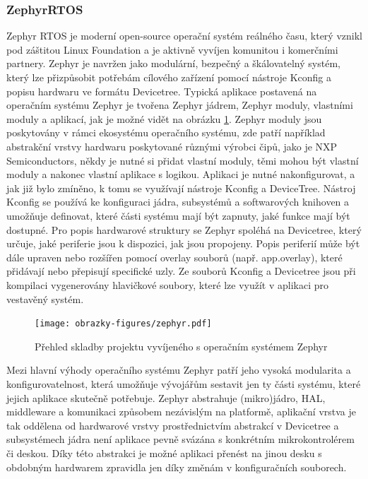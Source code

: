 \subsubsection{ZephyrRTOS}
\label{zephyr_rtos}
Zephyr RTOS je moderní open-source operační systém reálného času, který vznikl pod záštitou Linux Foundation a je aktivně vyvíjen komunitou i komerčními partnery. Zephyr je navržen jako modulární, bezpečný a škálovatelný systém, který lze přizpůsobit potřebám cílového zařízení pomocí nástroje Kconfig a popisu hardwaru ve formátu Devicetree. Typická aplikace postavená na operačním systému Zephyr je tvořena Zephyr jádrem, Zephyr moduly, vlastními moduly a aplikací, jak je možné vidět na obrázku \ref{fig:zephyr}. Zephyr moduly jsou poskytovány v rámci ekosystému operačního systému, zde patří například abstrakční vrstvy hardwaru poskytované různými výrobci čipů, jako je NXP Semiconductors, někdy je nutné si přidat vlastní moduly, těmi mohou být vlastní moduly a nakonec vlastní aplikace s logikou. Aplikaci je nutné nakonfigurovat, a jak již bylo zmíněno, k tomu se využívají nástroje Kconfig a DeviceTree. Nástroj Kconfig se používá ke konfiguraci jádra, subsystémů a softwarových knihoven a umožňuje  definovat, které části systému mají být zapnuty, jaké funkce mají být dostupné. Pro popis hardwarové struktury se Zephyr spoléhá na Devicetree, který určuje, jaké periferie jsou k dispozici, jak jsou propojeny. Popis periferií může být dále upraven nebo rozšířen pomocí overlay souborů (např. app.overlay), které přidávají nebo přepisují specifické uzly. Ze souborů Kconfig a Devicetree jsou při kompilaci vygenerovány hlavičkové soubory, které lze využít v aplikaci pro vestavěný systém. \cite{zephyr_doc_modules, embedded_summit_configure_zephyr}

\begin{figure}[h]
    \centering
    \texttt{[image: obrazky-figures/zephyr.pdf]}
    
    \caption{Přehled skladby projektu vyvíjeného s operačním systémem Zephyr \cite{embedded_summit_configure_zephyr}}
    \label{fig:zephyr}
\end{figure}

Mezi hlavní výhody operačního systému Zephyr patří jeho vysoká modularita a konfigurovatelnost, která umožňuje vývojářům sestavit jen ty části systému, které jejich aplikace skutečně potřebuje. Zephyr abstrahuje (mikro)jádro, HAL, middleware a komunikaci způsobem nezávislým na platformě, aplikační vrstva je tak oddělena od hardwarové vrstvy prostřednictvím abstrakcí v Devicetree a subsystémech jádra není aplikace pevně svázána s konkrétním mikrokontrolérem či deskou. Díky této abstrakci je možné aplikaci přenést na jinou desku s obdobným hardwarem zpravidla jen díky změnám v konfiguračních souborech. \cite{zephyr_advantages}


